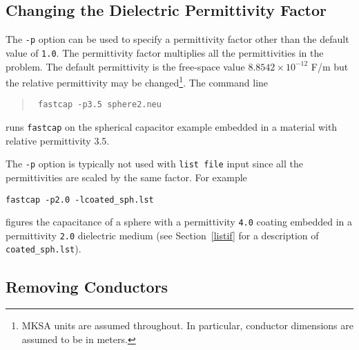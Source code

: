
\subsection{Changing the Dielectric Permittivity Factor}

The {\tt -p} option can be used to specify a permittivity factor
other than the default value of {\tt 1.0}.  The permittivity factor
multiplies all the permittivities in the problem.  
The default permittivity is the free-space value
$8.8542\times 10^{-12}$ F/m but
the relative permittivity may be changed\footnote{MKSA units are assumed throughout. In
particular, conductor dimensions are assumed to be in meters.}.
The command line
\begin{quote}\tt
fastcap -p3.5 sphere2.neu
\end{quote}
runs {\tt fastcap} on the spherical capacitor example embedded in
a material with relative permittivity $3.5$. 

The {\tt -p} option is
typically not used with {\tt list file} input since all the permittivities
are scaled by the same factor. For example
\begin{verbatim}
fastcap -p2.0 -lcoated_sph.lst
\end{verbatim}
figures the capacitance of a sphere with a permittivity {\tt 4.0} coating
embedded in a permittivity {\tt 2.0} dielectric medium (see
Section~\ref{listif} for a description of \verb~coated_sph.lst~).

\subsection{Removing Conductors}

